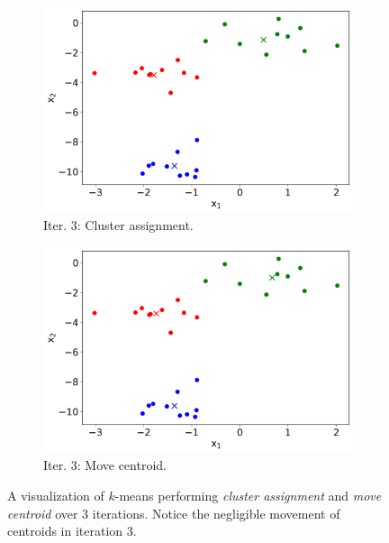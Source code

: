 \begin{figure}
\begin{subfigure}[b]{0.48\textwidth}
         \includegraphics[width=\textwidth]{"Part 3 - Learning Systems/Unsupervised Learning/k-Means/images/CA3.png"}
         \caption{Iter. 3: Cluster assignment.}
         \label{fig:k-means-loop-3-ca}
     \end{subfigure}
     \hfill
     \begin{subfigure}[b]{0.48\textwidth}
         \centering
         \includegraphics[width=\textwidth]{"Part 3 - Learning Systems/Unsupervised Learning/k-Means/images/MC3.png"}
         \caption{Iter. 3: Move centroid.}
         \label{fig:k-means-loop-3-mc}
     \end{subfigure}
        \caption{A visualization of $k$-means performing \emph{cluster assignment} and \emph{move centroid} over 3 iterations. Notice the negligible movement of centroids in iteration 3.}
        \label{fig:k-means-loop}
\end{figure}

